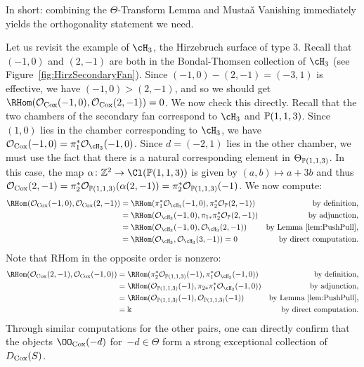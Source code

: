 \documentclass{amsart}
\begin{document}
In short:  combining the $\Theta$-Transform Lemma and Musta\v{a} Vanishing immediately yields the orthogonality statement we need.

\begin{example}\label{ex:hirzStrongBT}
 Let us revisit the example of $\cH_3$, the Hirzebruch surface of type 3. Recall that $(-1, 0)$ and $(2, -1)$ are both in the Bondal-Thomsen collection of $\cH_3$ (see Figure~\ref{fig:HirzSecondaryFan}). Since $(-1, 0) - (2, -1) = (-3, 1)$ is effective, we have $(-1, 0) > (2, -1)$, and so we should get $\RHom(\cO_{\Cox}(-1,0), \cO_{\Cox}(2,-1)) = 0$. We now check this directly. Recall that the two chambers of the secondary fan correspond to $\cH_3$ and $\mathbb P(1,1,3)$. Since $(1, 0)$ lies in the chamber corresponding to $\cH_3$, we have $\cO_{\Cox}(-1,0) = \pi_1^* \cO_{\cH_3}(-1,0)$.  Since $d=(-2,1)$ lies in the other chamber, we must use the fact that there is a natural corresponding element in $\Theta_{\mathbb P(1,1,3)}$.
In this case, the map $\alpha\colon \ZZ^2\to \Cl(\PP(1,1,3))$ is given by $(a,b) \mapsto a+3b$ and thus ${\mathcal O}_{\operatorname{Cox}}(2,-1) = \pi_2^* {\mathcal O}_{\mathbb P(1,1,3)}(\alpha(2,-1))=\pi_2^* {\mathcal O}_{\mathbb P(1,1,3)}(-1)$.
We now compute:
\begin{align*}
\RHom(\cO_{\Cox}(-1,0), \cO_{\Cox}(2,-1))
&=\RHom(\pi_1^*\cO_{\cH_3}(-1,0), \pi_2^*\cO_{\PP}(2,-1)) & \text{by definition,}\\
&=\RHom(\cO_{\cH_3}(-1,0), \pi_{1*}\pi_2^*\cO_{\PP}(2,-1)) & \text{by adjunction,}\\
&=\RHom(\cO_{\cH_3}(-1,0), \cO_{\cH_3}(2,-1)) & \text{by Lemma~\ref{lem:PushPull},}\\
&=\RHom(\cO_{\cH_3}, \cO_{\cH_3}(3,-1))=0 & \text{by direct computation.}
\end{align*}
Note that RHom in the opposite order is nonzero:
\begin{align*}
\RHom(\cO_{\Cox}(2,-1), \cO_{\Cox}(-1,0)) 
&=\RHom(\pi_2^*\cO_{\PP(1,1,3)}(-1), \pi_1^*\cO_{\cH_3}(-1,0))&\text{by definition,}\\
&=\RHom(\cO_{\PP(1,1,3)}(-1), \pi_{2*}\pi_1^*\cO_{\cH_3}(-1,0)) & \text{by adjunction,}\\
&=\RHom(\cO_{\PP(1,1,3)}(-1), \cO_{\PP(1,1,3)}(-1)) & \text{by Lemma~\ref{lem:PushPull},} \\
&= \Bbbk & \text{by direct computation.}
\end{align*}
Through similar computations for the other pairs, one can directly confirm that the objects $\OO_{\Cox}(-d)$ for~$-d \in \Theta$ form a strong exceptional collection of $D_{\operatorname{Cox}}(S)$.
\end{example}
\end{document}
